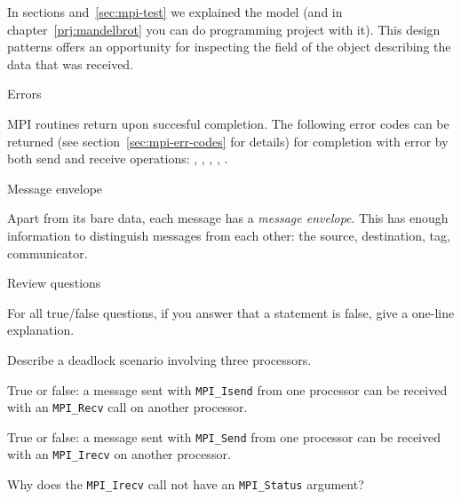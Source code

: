 In sections and~\ref{sec:mpi-test} we explained
the  model
(and in chapter~\ref{prj:mandelbrot} you can do programming project with it).
This design patterns offers an opportunity for inspecting the
 field of the 
object describing the data that was received.


 {Errors}

MPI routines return  upon succesful completion.
The following error codes can be returned
(see section~\ref{sec:mpi-err-codes} for details)
for completion with error by both send and receive operations:
  ,
  ,
  ,
  ,
  .


 {Message envelope}
\label{sec:mpi-envelope}

Apart from its bare data, each message has a \emph{message envelope}.
This has enough information to distinguish messages from each other:
the source, destination, tag, communicator.


 {Review questions}

For all true/false questions, if you answer that a statement is false,
give a one-line explanation.

\begin{review}
  Describe a deadlock scenario involving three processors.
\end{review}

\begin{review}
  True or false: a message sent with \lstinline{MPI_Isend} from one processor can be
  received with an \lstinline{MPI_Recv} call on another processor.
\end{review}

\begin{review}
  True or false: a message sent with \lstinline{MPI_Send} from one processor can be
  received with an \lstinline{MPI_Irecv} on another processor.
\end{review}

\begin{review}
  Why does the \lstinline{MPI_Irecv} call not have an \lstinline{MPI_Status} argument?
\end{review}

